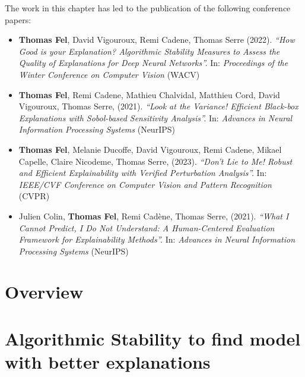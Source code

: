 The work in this chapter has led to the publication of the following conference papers:
{\small{
\begin{itemize}
    \item \textbf{Thomas Fel}, David Vigouroux, Remi Cadene, Thomas Serre (2022). \textit{``How Good is your Explanation? Algorithmic Stability Measures to Assess the Quality of Explanations for Deep Neural Networks''.} In: \textit{Proceedings of the Winter Conference on Computer Vision} (\textcolor{confcolor}{WACV})
    
    \item \textbf{Thomas Fel}\equal, Remi Cadene\equal, Mathieu Chalvidal, Matthieu Cord, David Vigouroux, Thomas Serre, (2021). \textit{``Look at the Variance! Efficient Black-box Explanations with Sobol-based Sensitivity Analysis''.} In: \textit{Advances in Neural Information Processing Systems}  (\textcolor{confcolor}{NeurIPS})
    
    \item \textbf{Thomas Fel}\equal, Melanie Ducoffe\equal, David Vigouroux\equal, Remi Cadene, Mikael Capelle, Claire Nicodeme, Thomas Serre, (2023). \textit{``Don't Lie to Me! Robust and Efficient Explainability with Verified Perturbation Analysis''.} In: \textit{IEEE/CVF Conference on Computer Vision and Pattern Recognition}  (\textcolor{confcolor}{CVPR})

    \item Julien Colin\equal, \textbf{Thomas Fel}\equal, Remi Cadène, Thomas Serre, (2021). \textit{``What I Cannot Predict, I Do Not Understand: A Human-Centered Evaluation Framework for Explainability Methods''.} In: \textit{Advances in Neural Information Processing Systems} (\textcolor{confcolor}{NeurIPS})    

\end{itemize}
}}

\minitoc
\clearpage









\section{Overview}
\label{sec:attributions:intro}

\clearpage

\section{Algorithmic Stability to find model with better explanations}
\label{sec:attributions:mege}

\clearpage

